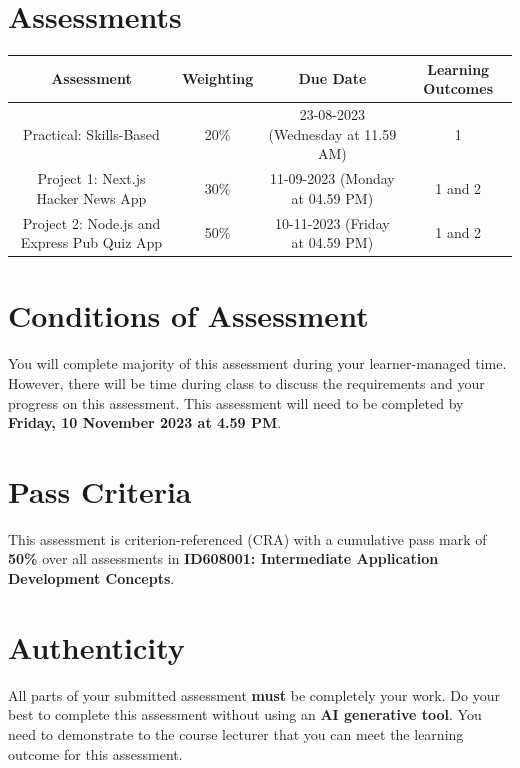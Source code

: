 \documentclass{article}
\begin{document}
\section*{Assessments}
\renewcommand{\arraystretch}{1.5}
\begin{tabular}{|c|c|c|c|}
	\hline
	\textbf{Assessment}                                 & \textbf{Weighting} & \textbf{Due Date}            & \textbf{Learning Outcomes} \\ \hline
	\small Practical: Skills-Based & \small 20\%        & \small 23-08-2023 (Wednesday at 11.59 AM)   & \small 1                   \\ \hline
	\small Project 1: Next.js Hacker News App             & \small 30\%        & \small 11-09-2023 (Monday at 04.59 PM)  & \small 1 and 2                   \\ \hline
	\small Project 2: Node.js and Express Pub Quiz App                       & \small 50\%        & \small 10-11-2023 (Friday at 04.59 PM)  & \small 1 and 2                   \\ \hline
\end{tabular}

\section*{Conditions of Assessment}
You will complete majority of this assessment during your learner-managed time. However, there will be time during class to discuss the requirements and your progress on this assessment. This assessment will need to be completed by \textbf{Friday, 10 November 2023 at 4.59 PM}.

\section*{Pass Criteria}
This assessment is criterion-referenced (CRA) with a cumulative pass mark of \textbf{50\%} over all assessments in \textbf{ID608001: Intermediate Application Development Concepts}.

\section*{Authenticity}
All parts of your submitted assessment \textbf{must} be completely your work. Do your best to complete this assessment without using an \textbf{AI generative tool}. You need to demonstrate to the course lecturer that you can meet the learning outcome for this assessment. \\
 
\end{document}
